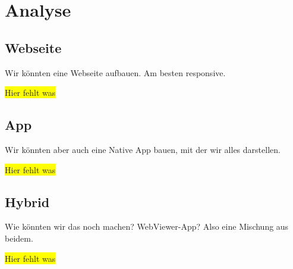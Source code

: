\section{Analyse}

\subsection{Webseite}
Wir könnten eine Webseite aufbauen. Am besten responsive.

\colorbox{yellow}{Hier fehlt was}

\subsection{App}
Wir könnten aber auch eine Native App bauen, mit der wir alles darstellen.

\colorbox{yellow}{Hier fehlt was}

\subsection{Hybrid}
Wie könnten wir das noch machen? WebViewer-App? Also eine Mischung aus beidem.

\colorbox{yellow}{Hier fehlt was}